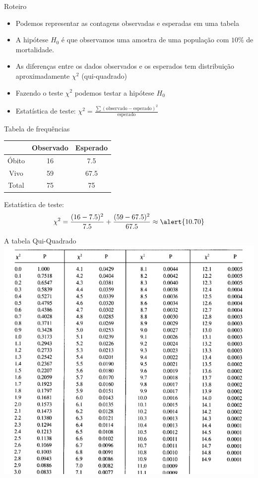 \documentclass{beamer}
\begin{document}
\begin{frame}{Roteiro}
  \begin{itemize}
  \item Podemos representar as contagens observadas e esperadas em uma tabela
  \item A hipótese $H_0$ é que \alert{observamos uma amostra de uma
      população com $10\%$ de mortalidade}.
  \item As diferenças entre os dados observados e os esperados tem
    distribuição aproximadamente $\chi^2$ (qui-quadrado)
  \item Fazendo o teste $\chi^2$ podemos testar a hipótese $H_0$
  \item Estatística de teste: $\chi^2 = \frac{\sum (\text{observado} - \text{esperado})^2 }{\text{esperado}}$
  \end{itemize}
\end{frame}

\begin{frame}{Tabela de frequências}
  \begin{example}
    \begin{tabular}{c|c|c}
      & Observado & Esperado\\
      \hline
      Óbito & 16 & 7.5 \\
      \hline
      Vivo & 59 & 67.5 \\
      \hline
      Total & 75 & 75\\
    \end{tabular}
  \end{example}

Estatística de teste:
  \begin{displaymath}
    \chi^2 = \frac{(16 - 7.5)^2}{7.5} + \frac{(59 - 67.5)^2}{67.5} \approx \alert{10.70}
  \end{displaymath}
\end{frame}

\begin{frame}{A tabela Qui-Quadrado}
\includegraphics[height=\textheight]{TC/qui-quadrado1}
\end{frame}
\end{document}
